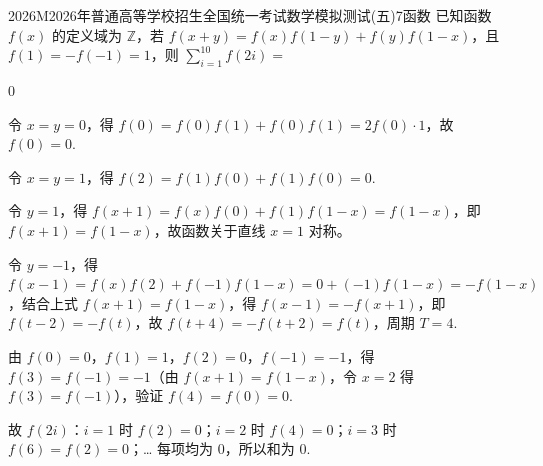 
\begin{problem}{2026}{M}{2026年普通高等学校招生全国统一考试数学模拟测试(五)}{7}{函数}
已知函数 $ f(x) $ 的定义域为 $ \mathbb{Z} $，若 $ f(x+y) = f(x)f(1-y) + f(y)f(1-x) $，且 $ f(1) = -f(-1) = 1 $，则 $ \displaystyle\sum_{i=1}^{10}f(2i) = $
\begin{choices}
\end{choices}
\end{problem}

\begin{answer}
$0$
\end{answer}

\begin{solutions}
令 $ x = y = 0 $，得 $ f(0) = f(0)f(1) + f(0)f(1) = 2f(0)\cdot1 $，故 $ f(0) = 0 $.

令 $ x = y = 1 $，得 $ f(2) = f(1)f(0) + f(1)f(0) = 0 $.

令 $ y = 1 $，得 $ f(x+1) = f(x)f(0) + f(1)f(1-x) = f(1-x) $，即 $ f(x+1) = f(1-x) $，故函数关于直线 $ x = 1 $ 对称。

令 $ y = -1 $，得 $ f(x-1) = f(x)f(2) + f(-1)f(1-x) = 0 + (-1)f(1-x) = -f(1-x) $，结合上式 $ f(x+1) = f(1-x) $，得 $ f(x-1) = -f(x+1) $，即 $ f(t-2) = -f(t) $，故 $ f(t+4) = -f(t+2) = f(t) $，周期 $ T = 4 $.

由 $ f(0)=0 $，$ f(1)=1 $，$ f(2)=0 $，$ f(-1)=-1 $，得 $ f(3) = f(-1) = -1 $（由 $ f(x+1)=f(1-x) $，令 $ x=2 $ 得 $ f(3)=f(-1) $），验证 $ f(4)=f(0)=0 $.

故 $ f(2i) $：$ i=1 $ 时 $ f(2)=0 $；$ i=2 $ 时 $ f(4)=0 $；$ i=3 $ 时 $ f(6)=f(2)=0 $；… 每项均为 $ 0 $，所以和为 $ 0 $.
\end{solutions}